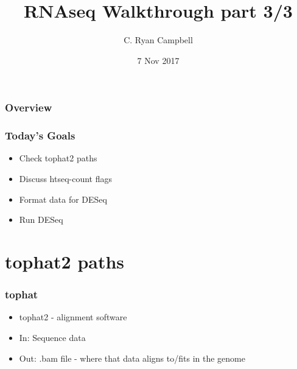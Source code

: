 \documentclass[14pt,handout]{beamer}
\title[RNAseq Practical pt3/3]{RNAseq Walkthrough part 3/3} %
\author{C. Ryan Campbell} %
\institute[Duke] %
{
Duke University \\ %
\medskip
\textit{c.ryan.campbell@duke.edu} %
}
\date{7 Nov 2017} %
\begin{document}
\begin{frame}
\titlepage %
\end{frame}

\begin{frame}
\frametitle{Overview} %
\tableofcontents %
\end{frame}


\begin{frame}
\frametitle{Today's Goals}
\begin{itemize}
	\item<+-> Check tophat2 paths
	\item<+-> Discuss htseq-count flags
	\item<+-> Format data for DESeq
	\item<+-> Run DESeq
\end{itemize}
\end{frame}


\section{tophat2 paths}

\begin{frame}
\frametitle{tophat}
\begin{itemize}
	\item<+-> tophat2 - alignment software
	\item<+-> In: Sequence data
	\item<+-> Out: .bam file - where that data aligns to/fits in the genome
\end{itemize}
\end{frame}
\end{document}
